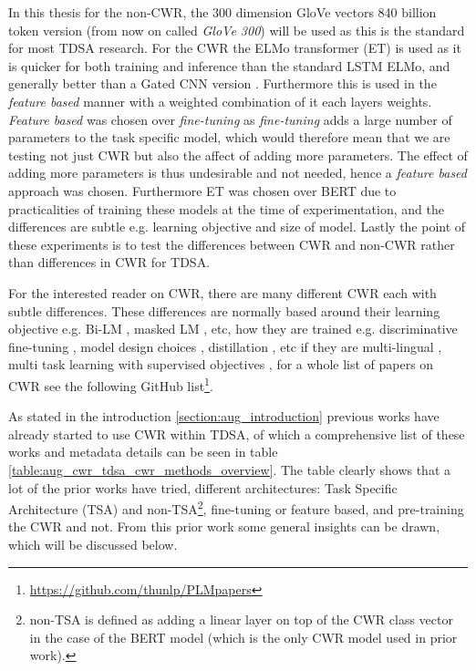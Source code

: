 In this thesis for the non-CWR, the 300 dimension GloVe vectors 840 billion token version (from now on called \textit{GloVe 300}) will be used as this is the standard for most TDSA research. For the CWR the ELMo transformer (ET) is used as it is quicker for both training and inference than the standard LSTM ELMo, and generally better than a Gated CNN version \citep{vectors_peters-etal-2018-dissecting}. Furthermore this is used in the \textit{feature based} manner with a weighted combination of it each layers weights. \textit{Feature based} was chosen over \textit{fine-tuning} as \textit{fine-tuning} adds a large number of parameters to the task specific model, which would therefore mean that we are testing not just CWR but also the affect of adding more parameters. The effect of adding more parameters is thus undesirable and not needed, hence a \textit{feature based} approach was chosen. Furthermore ET was chosen over BERT due to practicalities of training these models at the time of experimentation, and the differences are subtle e.g. learning objective and size of model. Lastly the point of these experiments is to test the differences between CWR and non-CWR rather than differences in CWR for TDSA.

For the interested reader on CWR, there are many different CWR each with subtle differences. These differences are normally based around their learning objective e.g. Bi-LM \citep{vectors_peters-etal-2018-deep}, masked LM \citep{vectors_devlin-etal-2019-bert}, etc, how they are trained e.g. discriminative fine-tuning \citep{vectors_howard-ruder-2018-universal}, model design choices \citep{vectors_liu2019roberta}, distillation \citep{vectors_tsai2019small}, etc if they are multi-lingual \citep{vectors_lample2019cross}, multi task learning with supervised objectives \citep{vectors_liu-etal-2019-multi}, for a whole list of papers on CWR see the following GitHub list\footnote{\url{https://github.com/thunlp/PLMpapers}}.

As stated in the introduction \ref{section:aug_introduction} previous works have already started to use CWR within TDSA, of which a comprehensive list of these works and metadata details can be seen in table \ref{table:aug_cwr_tdsa_cwr_methods_overview}. The table clearly shows that a lot of the prior works have tried, different architectures: Task Specific Architecture (TSA) and non-TSA\footnote{non-TSA is defined as adding a linear layer on top of the CWR class vector in the case of the BERT model (which is the only CWR model used in prior work).}, fine-tuning or feature based, and pre-training the CWR and not. From this prior work some general insights can be drawn, which will be discussed below.

